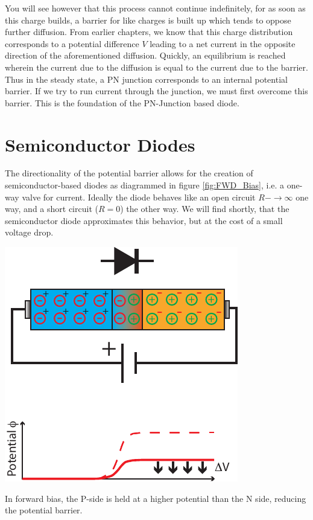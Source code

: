 \documentclass{tufte-book}
\begin{document}
You will see however that this process cannot continue indefinitely, for as soon as this charge builds, a barrier for like charges is built up which tends to oppose further diffusion. From earlier chapters, we know that this charge distribution corresponds to a potential difference $V$ leading to a net current in the opposite direction of the aforementioned diffusion. Quickly, an equilibrium is reached wherein the current due to the diffusion is equal to the current due to the barrier. Thus in the steady state, a PN junction corresponds to an internal potential barrier. If we try to run current through the junction, we must first overcome this barrier. This is the foundation of the PN-Junction based diode.

\section{Semiconductor Diodes}

The directionality of the potential barrier allows for the creation of semiconductor-based diodes as diagrammed in figure \ref{fig:FWD_Bias}, i.e. a one-way valve for current. Ideally the diode behaves like an open circuit $R-\rightarrow \infty$ one way, and a short circuit ($R=0$) the other way. We will find shortly, that the semiconductor diode approximates this behavior, but at the cost of a small voltage drop.

\begin{marginfigure}%
  \includegraphics[]{forward_bias}
  \caption{In forward bias, the P-side is held at a higher potential than the N side, reducing the potential barrier.}
  \label{fig:FWD_Bias}
\end{marginfigure}
\end{document}
